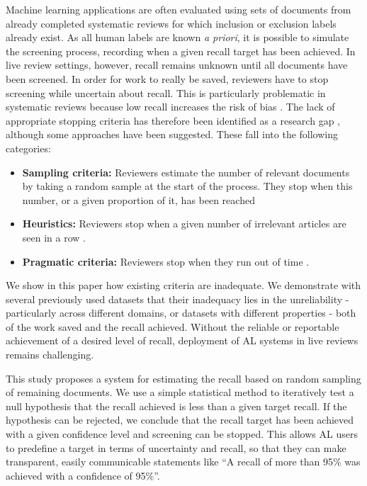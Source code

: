 \documentclass{bmcart}
\begin{document}
	Machine learning applications are often evaluated using sets of documents from already completed systematic reviews for which inclusion or exclusion labels already exist. 
	As all human labels are known \textit{a priori}, it is possible to simulate the screening process, recording when a given recall target has been achieved.
	In live review settings, however, recall remains unknown until all documents have been screened. 
	In order for work to really be saved, reviewers have to stop screening while uncertain about recall. 
	This is particularly problematic in systematic reviews because low recall increases the risk of bias \cite{Lefebvre2011}.
	The lack of appropriate stopping criteria has therefore been identified as a research gap \cite{bannach-brown2019, Marshall2019}, although some approaches have been suggested. These fall into the following categories:
	\begin{itemize}
		\item \textbf{Sampling criteria:} Reviewers estimate the number of relevant documents by taking a random sample at the start of the process. They stop when this number, or a given proportion of it, has been reached \cite{Shemilt2014}
		\item \textbf{Heuristics:} Reviewers stop when a given number of irrelevant articles are seen in a row \cite{Jonnalagadda2013, Przybya2018}. 
		\item \textbf{Pragmatic criteria:} Reviewers stop when they run out of time \cite{miwa2014}. 
	\end{itemize}
	
	We show in this paper how existing criteria are inadequate.
	We demonstrate with several previously used datasets that their inadequacy lies in the unreliability - particularly across different domains, or datasets with different properties \cite{OMara-Eves2015} - both of the work saved and the recall achieved.  
	Without the reliable or reportable achievement of a desired level of recall, deployment of AL systems in live reviews remains challenging.
	
	This study proposes a system for estimating the recall based on random sampling of remaining documents. 
	We use a simple statistical method to iteratively test a null hypothesis that the recall achieved is less than a given target recall. If the hypothesis can be rejected, we conclude that the recall target has been achieved with a given confidence level and screening can be stopped.
	This allows AL users to predefine a target in terms of uncertainty and recall, so that they can make transparent, easily communicable statements like ``A recall of more than 95\% was achieved with a confidence of 95\%''.
	
\end{document}
